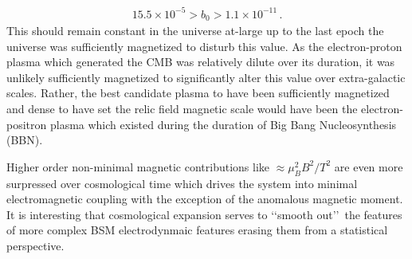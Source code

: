 \documentclass[
aps,
pra,
showpacs,
preprintnumbers,
amsmath,
amssymb,
footinbib
]{revtex4-2}
\begin{document}
\begin{alignat}{1}
    \label{BoScale} 5.5\times10^{-5}>b_{0}>1.1\times10^{-11}\,.
\end{alignat}
This should remain constant in the universe at-large up to the last epoch the universe was sufficiently magnetized to disturb this value. As the electron-proton plasma which generated the CMB was relatively dilute over its duration, it was unlikely sufficiently magnetized to significantly alter this value over extra-galactic scales. Rather, the best candidate plasma to have been sufficiently magnetized and dense to have set the relic field magnetic scale would have been the electron-positron plasma which existed during the duration of Big Bang Nucleosynthesis (BBN).

Higher order non-minimal magnetic contributions like $\approx\mu_{B}^{2}B^{2}/T^{2}$ are even more surpressed over cosmological time which drives the system into minimal electromagnetic coupling with the exception of the anomalous magnetic moment. It is interesting that cosmological expansion serves to \lq\lq smooth out\rq\rq\ the features of more complex BSM electrodynmaic features erasing them from a statistical perspective.
\end{document}
